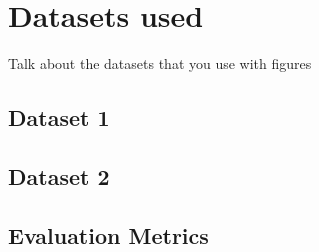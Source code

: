 \section{Datasets used}

Talk about the datasets that you use with figures

\subsection{Dataset 1}

\subsection{Dataset 2}

\subsection{Evaluation Metrics}